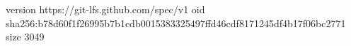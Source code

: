 version https://git-lfs.github.com/spec/v1
oid sha256:b78d60f1f26995b7b1cdb0015383325497ffd46cdf8171245df4b17f06bc2771
size 3049
